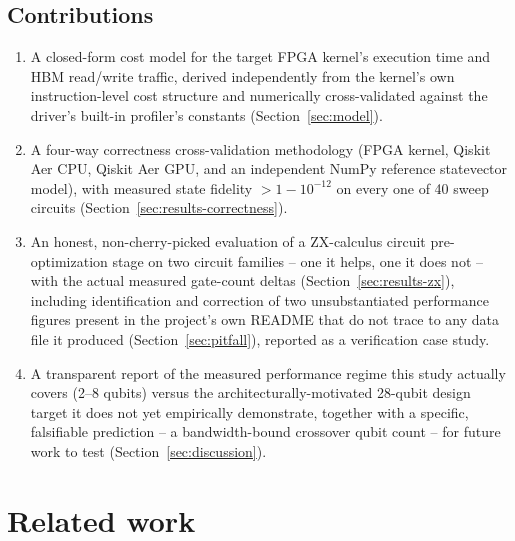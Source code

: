 \documentclass[pdflatex,sn-mathphys,Numbered]{sn-jnl}
\begin{document}
\subsection{Contributions}
\begin{enumerate}
\item A closed-form cost model for the target FPGA kernel's execution time and HBM read/write traffic, derived independently from the kernel's own instruction-level cost structure and numerically cross-validated against the driver's built-in profiler's constants (Section~\ref{sec:model}).
\item A four-way correctness cross-validation methodology (FPGA kernel, Qiskit Aer CPU, Qiskit Aer GPU, and an independent NumPy reference statevector model), with measured state fidelity $>1-10^{-12}$ on every one of 40 sweep circuits (Section~\ref{sec:results-correctness}).
\item An honest, non-cherry-picked evaluation of a ZX-calculus circuit pre-optimization stage on two circuit families -- one it helps, one it does not -- with the actual measured gate-count deltas (Section~\ref{sec:results-zx}), including identification and correction of two unsubstantiated performance figures present in the project's own README that do not trace to any data file it produced (Section~\ref{sec:pitfall}), reported as a verification case study.
\item A transparent report of the measured performance regime this study actually covers (2--8 qubits) versus the architecturally-motivated 28-qubit design target it does not yet empirically demonstrate, together with a specific, falsifiable prediction -- a bandwidth-bound crossover qubit count -- for future work to test (Section~\ref{sec:discussion}).
\end{enumerate}

\section{Related work}\label{sec:related}
\end{document}
